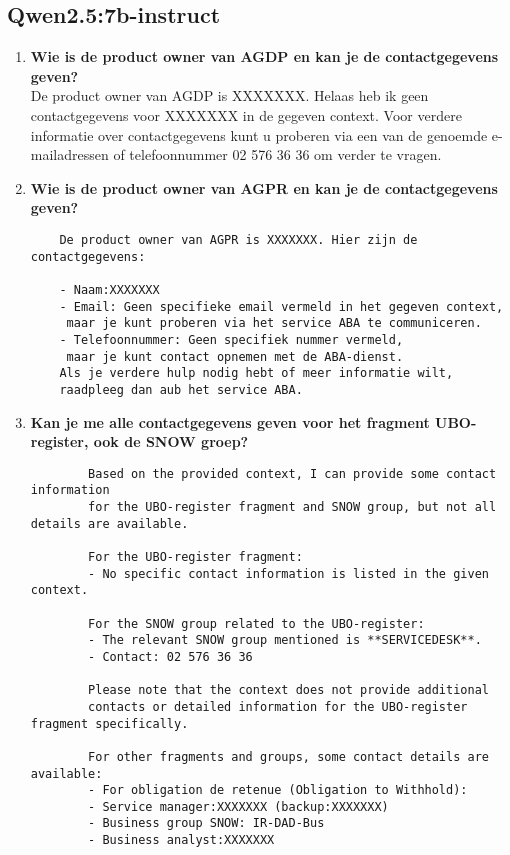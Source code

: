 \subsection{Qwen2.5:7b-instruct}
\begin{enumerate}
    \item \textbf{Wie is de product owner van AGDP en kan je de contactgegevens geven?} \\
    De product owner van AGDP is XXXXXXX.
    Helaas heb ik geen contactgegevens voor XXXXXXX in de gegeven context. Voor verdere informatie over contactgegevens kunt u proberen via een van de genoemde e-mailadressen of telefoonnummer 02 576 36 36 om verder te vragen.
    
    \item \textbf{Wie is de product owner van AGPR en kan je de contactgegevens geven?} \\
    \begin{verbatim}
    De product owner van AGPR is XXXXXXX. Hier zijn de contactgegevens:
    
    - Naam:XXXXXXX
    - Email: Geen specifieke email vermeld in het gegeven context,
     maar je kunt proberen via het service ABA te communiceren.
    - Telefoonnummer: Geen specifiek nummer vermeld,
     maar je kunt contact opnemen met de ABA-dienst.
    Als je verdere hulp nodig hebt of meer informatie wilt, 
    raadpleeg dan aub het service ABA.
    \end{verbatim}
    
    \item \textbf{Kan je me alle contactgegevens geven voor het fragment UBO-register, ook de SNOW groep?} \\
    \begin{verbatim}
        Based on the provided context, I can provide some contact information 
        for the UBO-register fragment and SNOW group, but not all details are available.
        
        For the UBO-register fragment:
        - No specific contact information is listed in the given context.
        
        For the SNOW group related to the UBO-register:
        - The relevant SNOW group mentioned is **SERVICEDESK**. 
        - Contact: 02 576 36 36
        
        Please note that the context does not provide additional 
        contacts or detailed information for the UBO-register fragment specifically.
        
        For other fragments and groups, some contact details are available:
        - For obligation de retenue (Obligation to Withhold):
        - Service manager:XXXXXXX (backup:XXXXXXX)
        - Business group SNOW: IR-DAD-Bus
        - Business analyst:XXXXXXX
        

\end{verbatim}
\end{enumerate}
